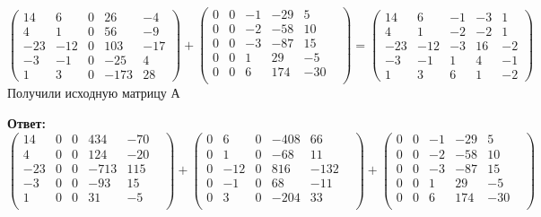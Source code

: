 \documentclass[a4paper,12pt]{article}
\begin{document}
\[
\left(\begin{matrix}
14 & 6 & 0 & 26 & -4 \\
4 & 1 & 0 & 56 & -9 \\
-23 & -12 & 0 & 103 & -17 \\
-3 & -1 & 0 & -25 & 4 \\
1 & 3 & 0 & -173 & 28
\end{matrix}\right)
+
\begin{pmatrix}
0 & 0 & -1 & -29& 5& \\
0 & 0 & -2 & -58& 10& \\
0 & 0 & -3 & -87& 15 & \\
0 & 0& 1 & 29& -5& \\
0& 0 & 6 & 174 & -30 & \\
\end{pmatrix} 
=
\left(\begin{matrix}
14 & 6 & -1 & -3 & 1 \\
4 & 1 & -2 & -2 & 1 \\
-23 & -12 & -3 & 16 & -2 \\
-3 & -1 & 1 & 4 & -1 \\
1 & 3 & 6 & 1 & -2
\end{matrix}\right)
\]
Получили исходную матрицу А
\begin{center}
\textbf{Ответ:}
\[
\begin{pmatrix}
14 & 0& 0& 434 & -70 & \\
4 & 0 & 0 & 124& -20& \\
-23 & 0 & 0 & -713& 115& \\
-3 & 0 & 0& -93& 15& \\
1 & 0& 0 & 31& -5& \\
\end{pmatrix} 
+
\begin{pmatrix}
0 & 6 & 0 & -408 & 66& \\
0 & 1 & 0&   -68 & 11& \\
0& -12 & 0 & 816 & -132& \\
0 & -1 & 0 & 68 & -11& \\
0& 3 & 0 & -204 & 33 & \\
\end{pmatrix} 
+
\begin{pmatrix}
0 & 0 & -1 & -29& 5& \\
0 & 0 & -2 & -58& 10& \\
0 & 0 & -3 & -87& 15 & \\
0 & 0& 1 & 29& -5& \\
0& 0 & 6 & 174 & -30 & \\
\end{pmatrix} 
\]
\end{center}
\clearpage
\end{document}
